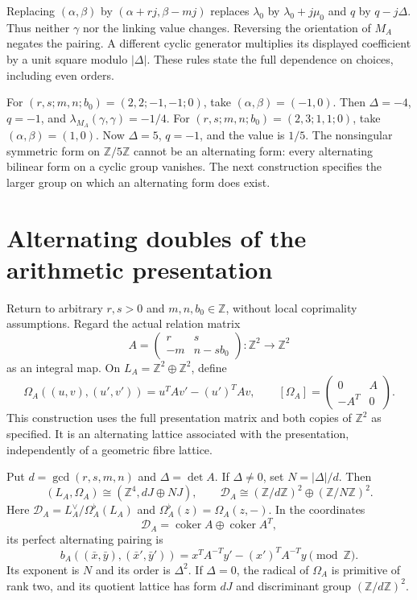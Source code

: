 \documentclass[11pt]{article}
\numberwithin{equation}{section}
\begin{document}
Replacing $(\alpha,\beta)$ by $(\alpha+rj,\beta-mj)$ replaces
$\lambda_0$ by $\lambda_0+j\mu_0$ and $q$ by $q-j\Delta$.
Thus neither $\gamma$ nor the linking value changes.
Reversing the orientation of $M_A$ negates the pairing.
A different cyclic generator multiplies its displayed coefficient by a
unit square modulo $|\Delta|$.
These rules state the full dependence on choices, including even orders.

For $(r,s;m,n;b_0)=(2,2;-1,-1;0)$, take
$(\alpha,\beta)=(-1,0)$.  Then $\Delta=-4$, $q=-1$, and
$\lambda_{M_A}(\gamma,\gamma)=-1/4$.
For $(r,s;m,n;b_0)=(2,3;1,1;0)$, take $(\alpha,\beta)=(1,0)$.
Now $\Delta=5$, $q=-1$, and the value is $1/5$.
The nonsingular symmetric form on $\mathbb Z/5\mathbb Z$ cannot
be an alternating form: every alternating bilinear form on a cyclic
group vanishes.  The next construction specifies the larger group
on which an alternating form does exist.

\section{Alternating doubles of the arithmetic presentation}

Return to arbitrary $r,s>0$ and $m,n,b_0\in\mathbb Z$, without
local coprimality assumptions.  Regard the actual relation matrix
\[
 A=\begin{pmatrix}r&s\\-m&n-sb_0\end{pmatrix}:\mathbb Z^2\to\mathbb Z^2
\]
as an integral map.  On $L_A=\mathbb Z^2\oplus\mathbb Z^2$, define
\begin{equation}\label{eq:doubled-form}
 \Omega_A((u,v),(u',v'))=u^TAv'-(u')^TAv,\qquad
 [\Omega_A]=\begin{pmatrix}0&A\\-A^T&0\end{pmatrix}.
\end{equation}
This construction uses the full presentation matrix and both copies of
$\mathbb Z^2$ as specified.  It is an alternating lattice associated
with the presentation, independently of a geometric fibre lattice.

\begin{theorem}\label{thm:double}
Put $d=\gcd(r,s,m,n)$ and $\Delta=\det A$.
If $\Delta\ne0$, set $N=|\Delta|/d$.  Then
\[
 (L_A,\Omega_A)\cong (\mathbb Z^4,dJ\oplus NJ),\qquad
 \mathcal D_A\cong(\mathbb Z/d\mathbb Z)^2
                    \oplus(\mathbb Z/N\mathbb Z)^2.
\]
Here $\mathcal D_A=L_A^\vee/\Omega_A^\flat(L_A)$ and
$\Omega_A^\flat(z)=\Omega_A(z,-)$.  In the coordinates
\[
 \mathcal D_A=\operatorname{coker}A\oplus\operatorname{coker}A^T,
\]
its perfect alternating pairing is
\begin{equation}\label{eq:arithmetic-pairing}
 b_A((\bar x,\bar y),(\bar x',\bar y'))
     =x^TA^{-T}y'-(x')^TA^{-T}y\pmod{\mathbb Z}.
\end{equation}
Its exponent is $N$ and its order is $\Delta^2$.
If $\Delta=0$, the radical of $\Omega_A$ is primitive of rank two,
and its quotient lattice has form $dJ$ and discriminant group
$(\mathbb Z/d\mathbb Z)^2$.
\end{theorem}
\end{document}
